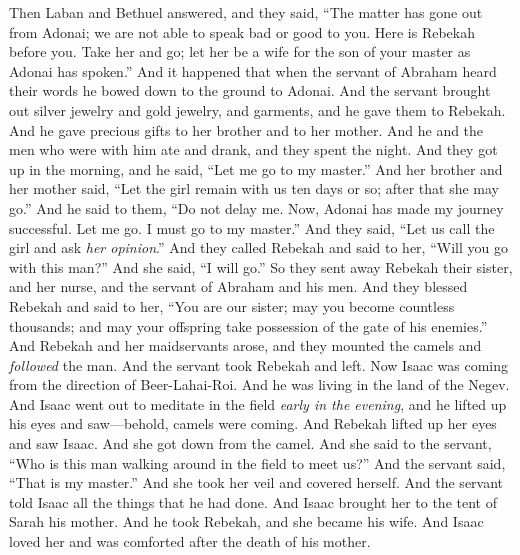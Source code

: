 \begin{biblechapter}
\verse Then Laban and Bethuel answered, and they said, “The matter has gone out from Adonai; we are not able to speak bad or good to you.
\verse Here is Rebekah before you. Take her and go; let her be a wife for the son of your master as Adonai has spoken.”
\verse And it happened that when the servant of Abraham heard their words he bowed down to the ground to Adonai.
\verse And the servant brought out silver jewelry and gold jewelry, and garments, and he gave them to Rebekah. And he gave precious gifts to her brother and to her mother.
\verse And he and the men who were with him ate and drank, and they spent the night. And they got up in the morning, and he said, “Let me go to my master.”
\verse And her brother and her mother said, “Let the girl remain with us ten days or so; after that she may go.”
\verse And he said to them, “Do not delay me. Now, Adonai has made my journey successful. Let me go. I must go to my master.”
\verse And they said, “Let us call the girl and ask \textit{her opinion}.”
\verse And they called Rebekah and said to her, “Will you go with this man?” And she said, “I will go.”
\verse So they sent away Rebekah their sister, and her nurse, and the servant of Abraham and his men.
\verse And they blessed Rebekah and said to her, “You are our sister; may you become countless thousands; and may your offspring take possession of the gate of his enemies.”
\verse And Rebekah and her maidservants arose, and they mounted the camels and \textit{followed} the man. And the servant took Rebekah and left.
\verse Now Isaac was coming from the direction of Beer-Lahai-Roi. And he was living in the land of the Negev.
\verse And Isaac went out to meditate in the field \textit{early in the evening}, and he lifted up his eyes and saw—behold, camels were coming.
\verse And Rebekah lifted up her eyes and saw Isaac. And she got down from the camel.
\verse And she said to the servant, “Who is this man walking around in the field to meet us?” And the servant said, “That is my master.” And she took her veil and covered herself.
\verse And the servant told Isaac all the things that he had done.
\verse And Isaac brought her to the tent of Sarah his mother. And he took Rebekah, and she became his wife. And Isaac loved her and was comforted after the death of his mother.
\end{biblechapter}

